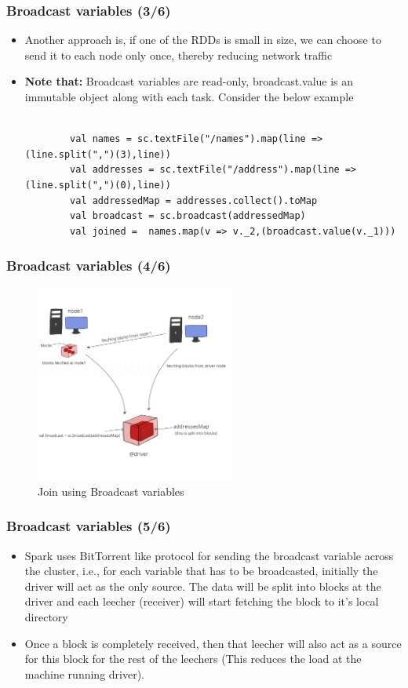 \begin{frame}[fragile]
	\frametitle{Broadcast variables (3/6)}
	\begin{itemize}[<+->]
		\item Another approach is, if one of the RDDs is small in size, we can choose to send it to each node only once, thereby reducing network traffic
		\item \textbf{Note that:} Broadcast variables are read-only, broadcast.value is an immutable object
		along with each task. Consider the below example
		\begin{lstlisting}[style=myScalastyle, caption=Broadcast variables Enhanced Example]
		
		val names = sc.textFile("/names").map(line => (line.split(",")(3),line))
		val addresses = sc.textFile("/address").map(line => (line.split(",")(0),line))
		val addressedMap = addresses.collect().toMap
		val broadcast = sc.broadcast(addressedMap)
		val joined =  names.map(v => v._2,(broadcast.value(v._1)))
		\end{lstlisting}		
	\end{itemize}
\end{frame}

\begin{frame}
	\frametitle{Broadcast variables (4/6)}
	\begin{figure}
		\caption{Join using Broadcast variables}	
		\includegraphics[width=\textwidth,height=6.5cm]{Graphics/BitTorrent.png}
	\end{figure}
	
\end{frame}



\begin{frame}
	\frametitle{Broadcast variables (5/6)}
	\begin{itemize}[<+->]
		\item Spark uses BitTorrent like protocol for sending the broadcast variable across the cluster, i.e., for each variable that has to be broadcasted, initially the driver will act as the only source. The data will be split into blocks at the driver and each leecher (receiver) will start fetching the block to it’s local directory
		\item Once a block is completely received, then that leecher will also act as a source for this block for the rest of the leechers (This reduces the load at the machine running driver).

	\end{itemize}
\end{frame}


